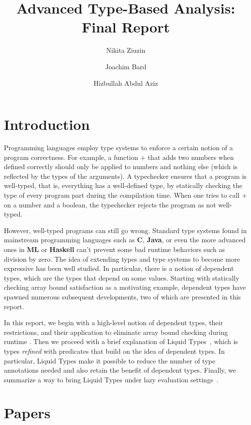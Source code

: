 \documentclass[a4paper,UKenglish]{lipics-v2016}
\title{Advanced Type-Based Analysis: Final Report}
\author[1]{Nikita Ziuzin}
\author[2]{Joachim Bard}
\author[3]{Hizbullah Abdul Aziz}
\affil[1]{\texttt{nzyuzin93@gmail.com}}
\affil[2]{\texttt{s9jobard@stud.uni-saarland.de}}
\affil[3]{\texttt{s8hijabb@stud.uni-saarland.de}}
\begin{document}
\maketitle


\section{Introduction}

Programming languages employ type systems to enforce a certain notion of a
program correctness. For example, a function $+$ that adds two numbers when
defined correctly should only be applied to numbers and nothing else (which
is reflected by the types of the arguments). A typechecker ensures that a
program is well-typed, that is, everything has a well-defined type, by
statically checking the type of every program part during the compilation
time.  When one tries to call $+$ on a number and a boolean, the typechecker
rejects the program as not well-typed.

However, well-typed programs can still go wrong. Standard type systems found
in mainstream programming languages such as \textbf{C}, \textbf{Java}, or
even the more advanced ones in \textbf{ML} or \textbf{Haskell} can't prevent
some bad runtime behaviors such as division by zero. The idea of extending
types and type systems to become more expressive has been well studied. In
particular, there is a notion of dependent types, which are the types that
depend on some values. Starting with statically checking array bound
satisfaction as a motivating example, dependent types have spawned numerous
subsequent developments, two of which are presented in this report.

In this report, we begin with a high-level notion of dependent types, their
restrictions, and their application to eliminate array bound checking during
runtime \cite{Xi:1998:EAB}. Then we proceed with a brief explanation of Liquid
Types~\cite{Rondon:2008:LT}, which is types \emph{refined} with predicates that
build on the idea of dependent types. In particular, Liquid Types make it
possible to reduce the number of type annotations needed and also retain the
benefit of dependent types.  Finally, we summarize a way to bring Liquid Types
under lazy evaluation settings~\cite{Vazou:ICFP:2014}.

\section{Papers}
\end{document}
